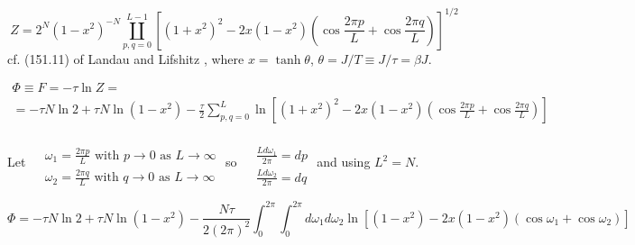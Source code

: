 \documentclass[10pt]{amsart}
\begin{document}
\begin{multicols*}{2}
\begin{equation}\label{Eq:2dIsingZexact}
Z = 2^N(1-x^2)^{-N} \coprod_{p,q=0}^{L-1} \left[ (1+x^2)^2 - 2x(1-x^2) \left( \cos{ \frac{2\pi p}{L} } + \cos{ \frac{2\pi q }{L} } \right) \right]^{1/2} 
\end{equation}
cf. (151.11) of Landau and Lifshitz \cite{LaLi1980}, where $x= \tanh{\theta}$, $\theta = J/T \equiv J/\tau = \beta J$.  

\begin{equation}
\begin{gathered}
\Phi \equiv F = -\tau \ln{Z} = \\
= -\tau N \ln{2} + \tau N \ln{ (1-x^2)} - \frac{\tau}{2} \sum_{p,q=0}^L \ln{ \left[ (1+x^2)^2 - 2x(1-x^2) \left( \cos{ \frac{2\pi p}{L} } + \cos{ \frac{2\pi q }{L} } \right) \right] }
\end{gathered}
\end{equation}

Let $\begin{aligned}& \quad \\ 
& \omega_1 = \frac{2\pi p }{ L } \text{ with } p\to 0 \text{ as } L \to \infty \\ 
& \omega_2 = \frac{2\pi q }{ L } \text{ with } q\to 0 \text{ as } L \to \infty \end{aligned}$ so $\begin{aligned} & \quad \\ 
& \frac{ L d\omega_1 }{2\pi } = dp \\ 
& \frac{ L d\omega_2}{ 2\pi } = dq \end{aligned}$ and using $L^2 = N$.  


\[
\Phi = -\tau N \ln{2} + \tau N \ln{ (1-x^2)} - \frac{N\tau }{ 2(2\pi)^2 } \int_0^{2\pi } \int_0^{2\pi } d\omega_1 d\omega_2 \ln{ \left[ (1-x^2) -  2x(1-x^2) \left( \cos{  \omega_1 } + \cos{  \omega_2 } \right) \right]  }
\] 


\end{multicols*}
\end{document}
